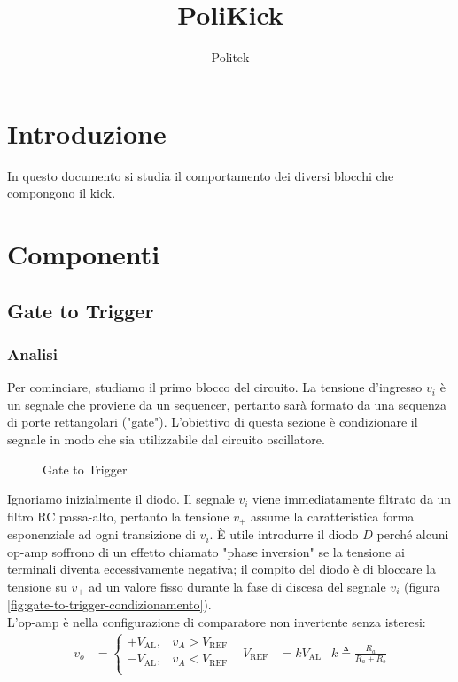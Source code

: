 \documentclass{article}
\title{PoliKick}
\author{Politek}
\newcommand{\var}[2]{#1_\mathrm{#2}}
\theoremstyle{definition}
\begin{document}
\maketitle



\section{Introduzione}
In questo documento si studia il comportamento dei diversi blocchi che compongono il kick.

\section{Componenti}

\subsection{Gate to Trigger}

\subsubsection{Analisi}
Per cominciare, studiamo il primo blocco del circuito.
La tensione d'ingresso \(v_i\) è un segnale che proviene da un sequencer, pertanto sarà formato da una sequenza di porte rettangolari ("gate").
L'obiettivo di questa sezione è condizionare il segnale in modo che sia utilizzabile dal circuito oscillatore.

\begin{figure}[ht]
    \centering
    
    \label{fig:gate-to-trigger}
    \caption{Gate to Trigger}
\end{figure}

Ignoriamo inizialmente il diodo. Il segnale \(v_i\) viene immediatamente filtrato da un filtro RC passa-alto, pertanto la tensione \(v_+\) assume la caratteristica forma esponenziale ad ogni transizione di \(v_i\).
È utile introdurre il diodo \(D\) perché alcuni op-amp soffrono di un effetto chiamato "phase inversion" se la tensione ai terminali diventa eccessivamente negativa; il compito del diodo è di bloccare la tensione su \(v_+\) ad un valore fisso durante la fase di discesa del segnale \(v_i\) (figura \ref{fig:gate-to-trigger-condizionamento}).
\\

L'op-amp è nella configurazione di comparatore non invertente senza isteresi:
%
\begin{align*}
    v_o &= \begin{cases}
        +\var{V}{AL}, & v_A > \var{V}{REF} \\
        -\var{V}{AL}, & v_A < \var{V}{REF} \\
    \end{cases}
    &
    \var{V}{REF} &= k \var{V}{AL}
    &
    k \triangleq \frac{R_a}{R_a + R_b}
\end{align*}
\end{document}
